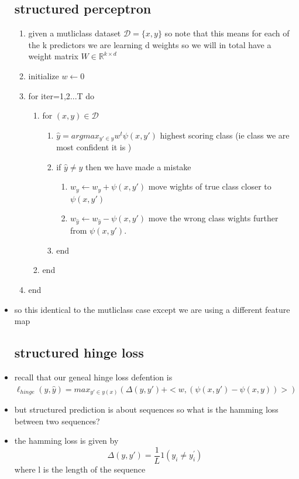 \documentclass{article}
\begin{document}
\begin{itemize}
\subsection*{structured perceptron}
\begin{enumerate}
    \item given a mutliclass dataset $\mathcal{D}=\{x,y\}$ so note that this means for each of the k predictors we are learning d weights so we will in total have a weight matrix $W\in \mathbb{R}^{k \times d }$
    \item initialize $w\leftarrow 0$
    \item for iter=1,2...T do
    \begin{enumerate}
        \item for $(x,y)\in \mathcal{D}$
        \begin{enumerate}
        \item $\hat{y}=argmax_{y'\in y}w^t\psi({x,y'})$ highest scoring class (ie class we are most confident it is )
        \item if $\hat{y}\neq y$ then we have made a mistake  
        \begin{enumerate}
            \item $w_{y}\leftarrow w_y+\psi({x,y'})$ move wights of true class closer to $\psi({x,y'})$  
            \item $w_{\hat{y}}\leftarrow w_{\hat{y}}-\psi({x,y'})$ move the wrong class wights further from $\psi({x,y'})$.
        \end{enumerate}
        \item end 
    \end{enumerate}
    \item end 
    \end{enumerate}
    \item end 
\end{enumerate}
\item so this identical to the mutliclass case except we are using a different feature map
\subsection*{structured hinge loss}
\item recall that our geneal hinge loss defention is $\ell_{hinge}(y,\hat{y})=max_{y'\in y(x) }(\Delta(y,y')+<w, (\psi(x,y') -\psi(x,y) )>   )$
\item but structured prediction is about sequences so what is the hamming loss between two sequences?
\item the hamming loss is given by $$\Delta(y,y')=\frac{1}{L}1(y_i\neq y_{i}^{'})$$ where l is the length of the sequence

\end{itemize}
\end{document}
